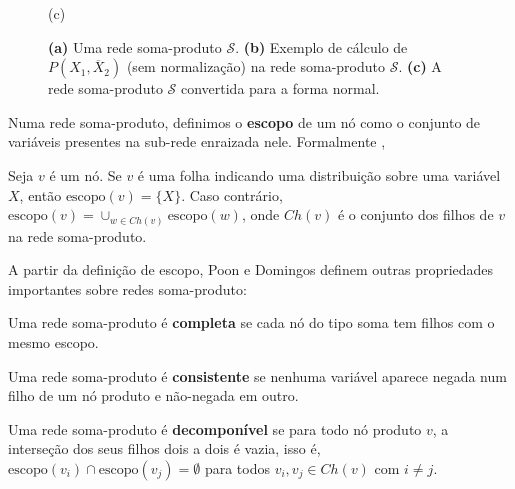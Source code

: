 \begin{figure}
\begin{minipage}{0.3333\textwidth}
{
    }

    (c)
  \end{minipage}

  \caption{
    \textbf{(a)} Uma rede soma-produto $\mathcal{S}$.
    \textbf{(b)} Exemplo de cálculo de $P(X_1, \overline X_2)$ (sem normalização) na rede soma-produto $\mathcal{S}$.
    \textbf{(c)} A rede soma-produto $\mathcal{S}$ convertida para a forma normal.
  }
  \label{fig:spn}
\end{figure}

\vspace{1em}

Numa rede soma-produto, definimos o \textbf{escopo} de um nó como o conjunto de variáveis presentes na sub-rede enraizada nele. Formalmente \cite{Zhao2015},

\begin{definition}[escopo]
  Seja $v$ é um nó. Se $v$ é uma folha indicando uma distribuição sobre uma variável $X$, então $\textrm{escopo}(v) = \{X\}$. Caso contrário, $\textrm{escopo}(v) = \cup_{w \in Ch(v)} \textrm{escopo}(w)$, onde $Ch(v)$ é o conjunto dos filhos de $v$ na rede soma-produto.
\end{definition}

A partir da definição de escopo, Poon e Domingos \cite{Poon2012} definem outras propriedades importantes sobre redes soma-produto:

\begin{definition}
  Uma rede soma-produto é \textbf{completa} se cada nó do tipo soma tem filhos com o mesmo escopo.
\end{definition}

\begin{definition}
  Uma rede soma-produto é \textbf{consistente} se nenhuma variável aparece negada num filho de um nó produto e não-negada em outro.
\end{definition}

\begin{definition}
  Uma rede soma-produto é \textbf{decomponível} se para todo nó produto $v$, a interseção dos seus filhos dois a dois é vazia, isso é, $\textrm{escopo}(v_i) \cap \textrm{escopo}(v_j) = \emptyset$ para todos $v_i, v_j \in Ch(v)$ com $i \neq j$.
\end{definition}

